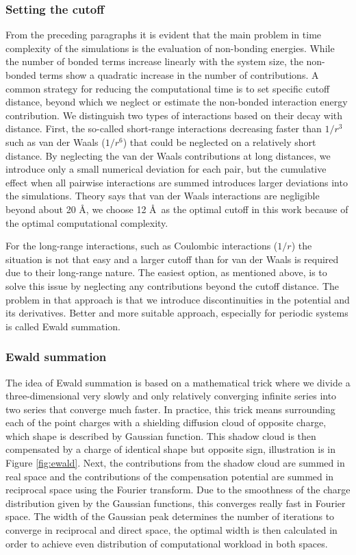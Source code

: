 \subsubsection{Setting the cutoff}
From the preceding paragraphs it is evident that the main problem in time complexity of the simulations is the evaluation of non-bonding energies. While the number of bonded terms increase linearly with the system size, the non-bonded terms show a quadratic increase in the number of contributions. A common strategy for reducing the computational time is to set specific cutoff distance, beyond which we neglect or estimate the non-bonded interaction energy contribution. We distinguish two types of interactions based on their decay with distance. First, the so-called short-range interactions decreasing faster than $1/r^3$ such as van der Waals ($1/r^6$) that could be neglected on a relatively short distance. By neglecting the van der Waals contributions at long distances, we introduce only a small numerical deviation for each pair, but the cumulative effect when all pairwise interactions are summed introduces larger deviations into the simulations. Theory says that van der Waals interactions are negligible beyond about 20 \AA, we choose 12 \AA~as the optimal cutoff in this work because of the optimal computational complexity. \cite{mdskripta}

For the long-range interactions, such as Coulombic interactions ($1/r$) the situation is not that easy and a larger cutoff than for van der Waals is required due to their long-range nature. The easiest option, as mentioned above, is to solve this issue by neglecting any contributions beyond the cutoff distance. The problem in that approach is that we introduce discontinuities in the potential and its derivatives. Better and more suitable approach, especially for periodic systems is called Ewald summation.


\subsubsection{Ewald summation}
The idea of Ewald summation is based on a mathematical trick where we divide a three-dimensional very slowly and only relatively converging infinite series into two series that converge much faster. In practice, this trick means surrounding each of the point charges with a shielding diffusion cloud of opposite charge, which shape is described by Gaussian function. This shadow cloud is then compensated by a charge of identical shape but opposite sign, illustration is in Figure \ref{fig:ewald}. Next, the contributions from the shadow cloud are summed in real space and the contributions of the compensation potential are summed in reciprocal space using the Fourier transform. Due to the smoothness of the charge distribution given by the Gaussian functions, this converges really fast in Fourier space. The width of the Gaussian peak determines the number of iterations to converge in reciprocal and direct space, the optimal width is then calculated in order to achieve even distribution of computational workload in both spaces. \cite{Sritterova}


